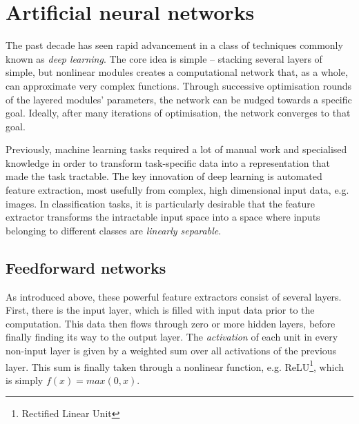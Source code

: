 \documentclass[../../report.tex]{subfiles}
\begin{document}
\section{Artificial neural networks}

The past decade has seen rapid advancement in a class of techniques commonly
known as \emph{deep learning}. The core idea is simple -- stacking several
layers of simple, but nonlinear modules creates a computational network that, as
a whole, can approximate very complex functions. Through successive optimisation
rounds of the layered modules' parameters, the network can be nudged towards a
specific goal. Ideally, after many iterations of optimisation, the network
converges to that goal.

Previously, machine learning tasks required a lot of manual work and specialised
knowledge in order to transform task-specific data into a representation that
made the task tractable. The key innovation of deep learning is automated
feature extraction, most usefully from complex, high dimensional input data,
e.g. images. In classification tasks, it is particularly desirable that the
feature extractor transforms the intractable input space into a space where
inputs belonging to different classes are \emph{linearly separable}.
\cite{LeCun2015}


\subsection{Feedforward networks}

As introduced above, these powerful feature extractors consist of several
layers. First, there is the input layer, which is filled with input data prior
to the computation. This data then flows through zero or more hidden layers,
before finally finding its way to the output layer. The \emph{activation} of
each unit in every non-input layer is given by a weighted sum over all
activations of the previous layer. This sum is finally taken through a nonlinear
function, e.g. ReLU\footnote{Rectified Linear Unit}, which is simply $f(x) =
max(0, x)$.

\end{document}
